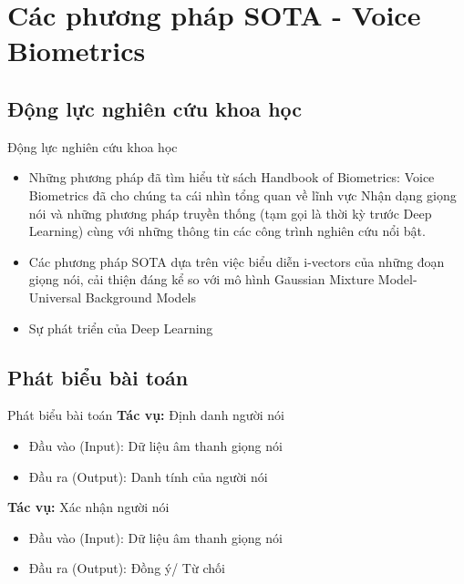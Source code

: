 \documentclass[notheorems, aspectratio=54]{beamer}
\begin{document}
\section{Các phương pháp SOTA - Voice Biometrics}
\subsection{Động lực nghiên cứu khoa học}
\begin{frame}{Động lực nghiên cứu khoa học}
		\begin{itemize}
		\item Những phương pháp đã tìm hiểu từ sách Handbook of Biometrics: Voice Biometrics đã cho chúng ta cái nhìn tổng quan về lĩnh vực Nhận dạng giọng nói và những phương pháp truyền thống (tạm gọi là thời kỳ trước Deep Learning) cùng với những thông tin các công trình nghiên cứu nổi bật.
		\item Các phương pháp SOTA dựa trên việc biểu diễn i-vectors của những
		đoạn giọng nói, cải thiện đáng kể so với mô hình Gaussian Mixture
		Model-Universal Background Models
		\item Sự phát triển của Deep Learning
	\end{itemize}
\end{frame}
\subsection{Phát biểu bài toán}
\begin{frame}{Phát biểu bài toán}
	\textbf{Tác vụ:} Định danh người nói
	\begin{itemize}
		\item Đầu vào (Input): Dữ liệu âm thanh giọng nói
		\item Đầu ra (Output): Danh tính của người nói
	\end{itemize}
	\textbf{Tác vụ:} Xác nhận người nói
	\begin{itemize}
		\item Đầu vào (Input): Dữ liệu âm thanh giọng nói
		\item Đầu ra (Output): Đồng ý/ Từ chối
	\end{itemize}
\end{frame}
\end{document}
